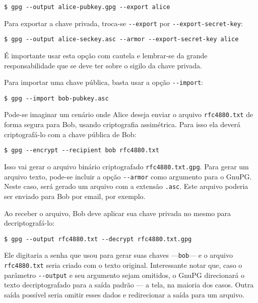 \documentclass[12px,a4paper,twoside]{article}
\begin{document}
\begin{verbatim}
$ gpg --output alice-pubkey.gpg --export alice
\end{verbatim}

Para exportar a chave privada, troca-se \texttt{-{}-export} por
\texttt{-{}-export-secret-key}:

\begin{verbatim}
$ gpg --output alice-seckey.asc --armor --export-secret-key alice
\end{verbatim}

É importante usar esta opção com cautela e lembrar-se da grande
responsabilidade que se deve ter sobre o sigilo da chave privada.

Para importar uma chave pública, basta usar a opção \texttt{-{}-import}:

\begin{verbatim}
$ gpg --import bob-pubkey.asc
\end{verbatim}

Pode-se imaginar um cenário onde Alice deseja enviar o arquivo
\texttt{rfc4880.txt}  de forma segura para Bob, usando criptografia
assimétrica.  Para isso ela deverá criptografá-lo com a chave pública de Bob:

\begin{verbatim}
$ gpg --encrypt --recipient bob rfc4880.txt
\end{verbatim}

Isso vai gerar o arquivo binário criptografado \texttt{rfc4880.txt.gpg}.  Para
gerar um arquivo texto, pode-se incluir a opção \texttt{-{}-armor} como
argumento para o GnuPG.  Neste caso, será gerado um arquivo com a extensão
\texttt{.asc}.  Este arquivo poderia ser enviado para Bob por email, por
exemplo.

Ao receber o arquivo, Bob deve aplicar sua chave privada no mesmo para
decriptografá-lo:

\begin{verbatim}
$ gpg --output rfc4880.txt --decrypt rfc4880.txt.gpg
\end{verbatim}

Ele digitaria a senha que usou para gerar suas chaves ---\texttt{bob}--- e o
arquivo \texttt{rfc4880.txt} seria criado com o texto original.  Interessante
notar que, caso o parâmetro \texttt{-{}-output} e seu argumento sejam omitidos,
o GnuPG direcionará o texto decriptografado para a saída padrão --- a tela, na
maioria dos casos.  Outra saída possível seria omitir esses dados e
redirecionar a saída para um arquivo.
\end{document}
